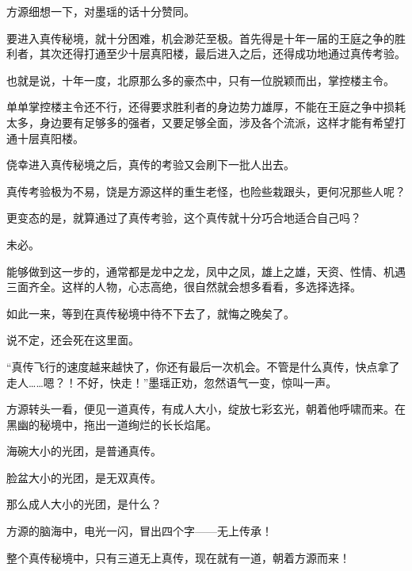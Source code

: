 \begin{this_body}
方源细想一下，对墨瑶的话十分赞同。

要进入真传秘境，就十分困难，机会渺茫至极。首先得是十年一届的王庭之争的胜利者，其次还得打通至少十层真阳楼，最后进入之后，还得成功地通过真传考验。

也就是说，十年一度，北原那么多的豪杰中，只有一位脱颖而出，掌控楼主令。

单单掌控楼主令还不行，还得要求胜利者的身边势力雄厚，不能在王庭之争中损耗太多，身边要有足够多的强者，又要足够全面，涉及各个流派，这样才能有希望打通十层真阳楼。

侥幸进入真传秘境之后，真传的考验又会刷下一批人出去。

真传考验极为不易，饶是方源这样的重生老怪，也险些栽跟头，更何况那些人呢？

更变态的是，就算通过了真传考验，这个真传就十分巧合地适合自己吗？

未必。

能够做到这一步的，通常都是龙中之龙，凤中之凤，雄上之雄，天资、性情、机遇三面齐全。这样的人物，心志高绝，很自然就会想多看看，多选择选择。

如此一来，等到在真传秘境中待不下去了，就悔之晚矣了。

说不定，还会死在这里面。

“真传飞行的速度越来越快了，你还有最后一次机会。不管是什么真传，快点拿了走人……嗯？！不好，快走！”墨瑶正劝，忽然语气一变，惊叫一声。

方源转头一看，便见一道真传，有成人大小，绽放七彩玄光，朝着他呼啸而来。在黑幽的秘境中，拖出一道绚烂的长长焰尾。

海碗大小的光团，是普通真传。

脸盆大小的光团，是无双真传。

那么成人大小的光团，是什么？

方源的脑海中，电光一闪，冒出四个字——无上传承！

整个真传秘境中，只有三道无上真传，现在就有一道，朝着方源而来！

\end{this_body}

